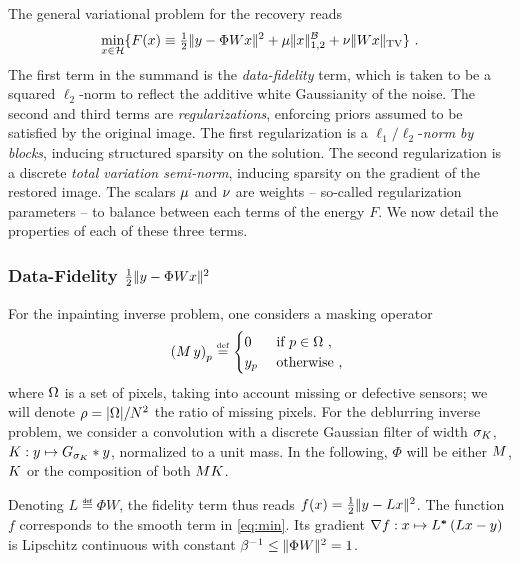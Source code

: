 The general variational problem for the recovery reads
%
\begin{equation}\label{eq:vpb}
  \umin{x \in \Hh} \{F(x) \equiv \half \norm{y - \Phi W x}^2 + \musp \normbk{x} + \mutv \normtv{W x}\} ~.
\end{equation}
%
The first term in the summand is the \textit{data-fidelity} term, which is taken to be a squared $\ell_2$-norm to reflect the additive white Gaussianity of the noise. The second and third terms are \textit{regularizations}, enforcing priors assumed to be satisfied by the original image. The first regularization is a $\ell_1/\ell_2$-\textit{norm by blocks}, inducing structured sparsity on the solution. The second regularization is a discrete \textit{total variation semi-norm}, inducing sparsity on the gradient of the restored image. The scalars $\mu$ and $\nu$ are weights -- so-called regularization parameters -- to balance between each terms of the energy $F$. We now detail the properties of each of these three terms.

	\subsubsection{Data-Fidelity ${\textstyle \frac{1}{2}} |\kern-1pt| y - \Phi W x |\kern-1pt|^2$}
	\label{sec:data-fid}

For the inpainting inverse problem, one considers a masking operator 
%
\begin{equation*}
  \left( M \, y \right)_p \stackrel{\mathrm{\scriptscriptstyle{def}}}{=} \begin{cases}
	0    & ~\text{if}~ p \in \Omega~, \\
        y_p  & ~\text{otherwise~,}~   \end{cases}
\end{equation*}
%
where $\Omega$ is a set of pixels, taking into account missing or defective sensors; we will denote $\rho = \lvert \Omega \rvert/N^2$ the ratio of missing pixels. For the deblurring inverse problem, we consider a convolution with a discrete Gaussian filter of width $\sigma_{K}$, $K : y \mapsto G_{\sigma_{K}} \ast y$, normalized to a unit mass. In the following, $\Phi$ will be either $M$, $K$ or the composition of both $M  K$.

\medskip

Denoting $L \eqdef \Phi W$, the fidelity term thus reads $f(x) = {\textstyle \frac{1}{2}} |\kern-1pt| y - L x |\kern-1pt|^2$. The function $f$ corresponds to the smooth term in \eqref{eq:min}. Its gra\-dient $\nabla f : x \mapsto {L}^{\boldsymbol*} \left( Lx - y \right)$ is Lipschitz continuous with constant $\beta^{-1} \leq |\kern-1pt| \Phi W |\kern-1pt|^2 = 1$.


